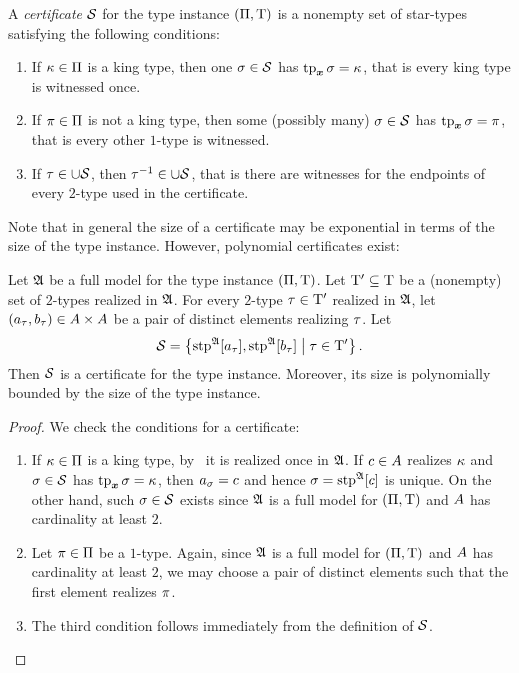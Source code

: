 \begin{definition}
A \emph{certificate} $\mathcal{S}$ for the type instance $(\Pi,\mathrm{T})$ is a
nonempty set of star-types satisfying the following conditions:
\begin{enumerate}
  \item If $\kappa \in \Pi$ is a king type, then one $\sigma \in \mathcal{S}$ has
  $\operatorname{tp}_{\bm{x}}\sigma = \kappa$, that is every king type is witnessed once.
  \item If $\pi \in \Pi$ is not a king type, then some (possibly many)
  $\sigma \in \mathcal{S}$ has $\operatorname{tp}_{\bm{x}}\sigma = \pi$, that is every other $1$-type is
  witnessed.
  \item If $\tau \in \cup\mathcal{S}$, then $\tau^{-1} \in \cup\mathcal{S}$, that is there
  are witnesses for the endpoints of every $2$-type used in the certificate.
\end{enumerate}
\end{definition}
Note that in general the size of a certificate may be exponential in terms of
the size of the type instance. However, polynomial certificates exist:
\begin{lemma}\label{lem:cert-extract}
Let $\mathfrak{A}$ be a full model for the type instance $(\Pi,\mathrm{T})$.
Let ${\mathrm{T}'} \subseteq \mathrm{T}$ be a (nonempty) set of $2$-types realized in
$\mathfrak{A}$.
For every $2$-type $\tau \in {\mathrm{T}'}$ realized in $\mathfrak{A}$, let $(a_\tau,
b_\tau) \in A\times A$ be a pair of distinct elements realizing
$\tau$.
Let 
\[
  \mathcal{S} = \left\{\operatorname{stp}^{\mathfrak{A}}[a_\tau], \operatorname{stp}^{\mathfrak{A}}[b_\tau]\mathrel{}\middle|\mathrel{}\tau \in
  {\mathrm{T}'}\right\}.
\]
Then $\mathcal{S}$ is a certificate for the type instance. Moreover, its size is
polynomially bounded by the size of the type instance.
\end{lemma}
\begin{proof}
We check the conditions for a certificate:
\begin{enumerate}
  \item If $\kappa \in \Pi$ is a king type, by~ it
  is realized once in $\mathfrak{A}$. If $c \in A$ realizes $\kappa$ and $\sigma
  \in \mathcal{S}$ has $\operatorname{tp}_{\bm{x}}\sigma = \kappa$, then $a_\sigma = c$ and hence
  $\sigma = \operatorname{stp}^{\mathfrak{A}}[c]$ is unique. On the other hand, such $\sigma \in \mathcal{S}$
  exists since $\mathfrak{A}$ is a full model for $(\Pi,\mathrm{T})$ and $A$ has
  cardinality at least $2$.
  \item Let $\pi \in \Pi$ be a $1$-type. Again, since $\mathfrak{A}$ is a full
  model for $(\Pi,\mathrm{T})$ and $A$ has cardinality at least $2$, we may
  choose a pair of distinct elements such that the first element realizes
  $\pi$.
  \item The third condition follows immediately from the definition of $\mathcal{S}$.
\end{enumerate}
\end{proof}

